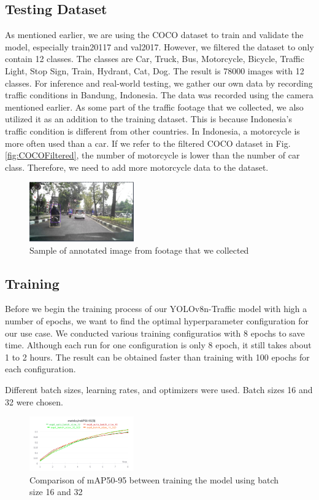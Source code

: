\documentclass[conference]{IEEEtran}
\begin{document}
\subsection{Testing Dataset}
As mentioned earlier, we are using the COCO dataset to train and validate the model, especially train20117 and val2017. However, we filtered the dataset to only contain 12 classes. The classes are
Car, Truck, Bus, Motorcycle, Bicycle, Traffic Light, Stop Sign, Train, Hydrant, Cat, Dog. The result is 78000 images with 12 classes.
For inference and real-world testing, we gather our own data by recording traffic conditions in Bandung, Indonesia. The data was recorded using the camera mentioned earlier.
As some part of the traffic footage that we collected, we also utilized it as an addition to the training dataset. This is because Indonesia's traffic condition is different from other countries. In Indonesia, a motorcycle is more often used than a car.
If we refer to the filtered COCO dataset in Fig.\ref{fig:COCOFiltered}, the number of motorcycle is lower than the number of car class. Therefore, we need to add more motorcycle data to the dataset.
\begin{figure}[h]
\centering
\includegraphics[width=0.4\textwidth,keepaspectratio]{sample_dataset.png}
\caption{Sample of annotated image from footage that we collected}
\end{figure}

\subsection{Training}
Before we begin the training process of our YOLOv8n-Traffic model with high a number of epochs, we want to find the optimal hyperparameter configuration for our use case. We conducted various training configuratios with 8 epochs to save time.
Although each run for one configuration is only 8 epoch, it still takes about 1 to 2 hours. The result can be obtained faster than training with 100 epochs for each configuration.

Different batch sizes, learning rates, and optimizers were used. Batch sizes 16 and 32 were chosen.
\begin{figure}[h]
\centering
\includegraphics[width=0.4\textwidth,keepaspectratio]{mAP_batch_size_comparison.png} %
\caption{Comparison of mAP50-95 between training the model using batch size 16 and 32}
\label{fig:batch_size}
\end{figure}
\end{document}
